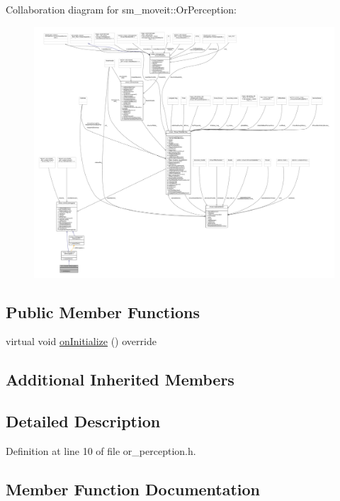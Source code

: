 Collaboration diagram for sm\+\_\+moveit\+:\+:Or\+Perception\+:
\nopagebreak
\begin{figure}[H]
\begin{center}
\leavevmode
\includegraphics[width=350pt]{classsm__moveit_1_1OrPerception__coll__graph}
\end{center}
\end{figure}
\subsection*{Public Member Functions}
\begin{DoxyCompactItemize}
\item 
virtual void \hyperlink{classsm__moveit_1_1OrPerception_af5721051a0575a4a1f3d50aef7f2bdba}{on\+Initialize} () override
\end{DoxyCompactItemize}
\subsection*{Additional Inherited Members}


\subsection{Detailed Description}


Definition at line 10 of file or\+\_\+perception.\+h.



\subsection{Member Function Documentation}
